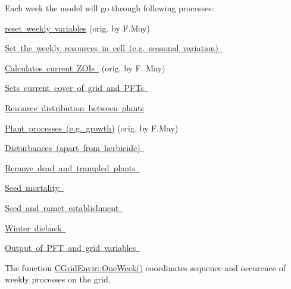 Each week the model will go through following processes\+:
\begin{DoxyItemize}
\item \mbox{\hyperlink{class_c_grid_ad18ff5c3a42c370966e07d02daadb8b0}{reset weekly variables}} (orig. by F.\+May)
\item \mbox{\hyperlink{class_c_grid_aefbb8b3705148ab6a0baaa094276a62d}{Set the weekly resources in cell (e.\+g. seasonal variation) }}
\item \mbox{\hyperlink{class_c_grid_a4192c45a00e1b07e475e0f20bc87e67d}{Calculates current Z\+O\+Is }} (orig. by F. May)
\item \mbox{\hyperlink{}{Sets current cover of grid and P\+F\+Ts }}
\item \mbox{\hyperlink{class_c_grid_a51b5f510fc52d65bf24ae5272992f22e}{Resource distribution between plants}}
\item \mbox{\hyperlink{class_c_grid_ad1258e316e92fd63a0efa7f594cefbf3}{Plant processes (e.\+g. growth)}} (orig. by F.\+May)
\item \mbox{\hyperlink{class_c_grid_a684a34a53f8210acbd15926830d706c2}{Disturbances (apart from herbicide) }}
\item \mbox{\hyperlink{class_c_grid_a7171b0bfab7bb77fe6afe69264d38111}{Remove dead and trampled plants }}
\item \mbox{\hyperlink{class_c_grid_ad39e5ec82353d218a0a6d469ce2a88e1}{Seed mortality }}
\item \mbox{\hyperlink{class_c_grid_af762d179a32b74b78502ed926cfd35ed}{Seed and ramet establishment }}
\item \mbox{\hyperlink{class_c_grid_a9ef602766345b51cd53326211b4e2ca9}{Winter dieback }}
\item \mbox{\hyperlink{class_c_grid_envir_ad14451529b1a3f9b7591f4d5b4e321c5}{Output of P\+FT and grid variables }}
\end{DoxyItemize}

The function \mbox{\hyperlink{class_c_grid_envir_a5c5cde58adbcee3ec3fd54c734228bf6}{C\+Grid\+Envir\+::\+One\+Week()}} coordinates sequence and occurence of weekly processes on the grid. 